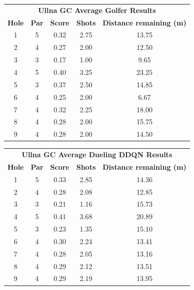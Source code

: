 \documentclass{kththesis}
\begin{document}
\begin{table}
    \begin{subtable}{\textwidth}
    \centering
    \begin{tabular}{c|c|c|c|c}
    \multicolumn{5}{c}{\textbf{Ullna GC Average Golfer Results}} \\
        \textbf{Hole} & \textbf{Par} & \textbf{Score} & \textbf{Shots} & \textbf{Distance remaining (m)}  \\ \hline
        1 & 5 & 0.32 & 2.75 & 13.75 \\ 
        2 & 4 & 0.27 & 2.00 & 12.50 \\ 
        3 & 3 & 0.17 & 1.00 & 9.65 \\ 
        4 & 5 & 0.40 & 3.25 & 23.25 \\ 
        5 & 3 & 0.37 & 2.50 & 14.85 \\ 
        6 & 4 & 0.25 & 2.00 & 6.67 \\ 
        7 & 4 & 0.32 & 2.25 & 18.00 \\ 
        8 & 4 & 0.28 & 2.00 & 15.75 \\ 
        9 & 4 & 0.28 & 2.00 & 14.50 \\ 
    \end{tabular}
    \end{subtable}
    \hfill
    \begin{subtable}{\textwidth}
    \centering
    \begin{tabular}{c|c|c|c|c}
    \multicolumn{5}{c}{\textbf{Ullna GC Average Dueling DDQN Results}} \\
        \textbf{Hole} & \textbf{Par} & \textbf{Score} & \textbf{Shots} & \textbf{Distance remaining (m)}  \\ \hline
        1 & 5 & 0.33 & 2.85 & 14.36 \\ 
        2 & 4 & 0.28 & 2.08 & 12.85 \\ 
        3 & 3 & 0.21 & 1.16 & 15.73 \\ 
        4 & 5 & 0.41 & 3.68 & 20.89 \\ 
        5 & 3 & 0.23 & 1.35 & 15.10 \\ 
        6 & 4 & 0.30 & 2.24 & 13.41 \\ 
        7 & 4 & 0.28 & 2.05 & 13.16 \\ 
        8 & 4 & 0.29 & 2.12 & 13.51 \\ 
        9 & 4 & 0.29 & 2.19 & 13.95 \\ 
    \end{tabular}
    \end{subtable}
    \hfill

\end{table}
\end{document}
